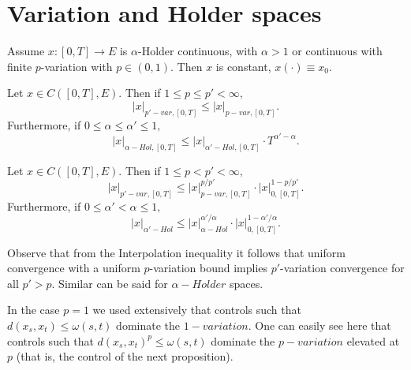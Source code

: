 \section{Variation and Holder spaces}

\begin{proposition}
    Assume $x: [0,T] \rightarrow E$ is $\alpha$-Holder continuous, with $\alpha > 1$ or continuous with finite $p$-variation with $p \in (0, 1).$
    Then $x$ is constant, $x(\cdot) \equiv x_0.$
\end{proposition}

\begin{proposition}
    Let $x \in C([0,T], E)$. Then if $1 \leq p \leq p' < \infty,$
    \begin{equation}
        |x|_{p'-var, [0,T]} \leq |x|_{p-var, [0,T]}. 
    \end{equation} 
    Furthermore, if $0 \leq \alpha \leq \alpha' \leq 1,$
    \begin{equation}
        |x|_{\alpha-Hol,[0,T]} \leq |x|_{\alpha'-Hol,[0,T]} \cdot T^{\alpha' - \alpha}.
    \end{equation}
\end{proposition}

\begin{proposition}[Interpolation]
        Let $x \in C([0,T], E)$. Then if $1 \leq p < p' < \infty,$
    \begin{equation}
        |x|_{p'-var, [0,T]} \leq |x|_{p-var, [0,T]}^{p/p'} \cdot |x|_{0,[0,T]}^{1 - p/p'}. 
    \end{equation} 
    Furthermore, if $0 \leq \alpha' < \alpha \leq 1,$
    \begin{equation}
        |x|_{\alpha'-Hol} \leq |x|_{\alpha-Hol}^{\alpha' / \alpha} \cdot |x|_{0,[0,T]}^{1 - \alpha' / \alpha}.
    \end{equation}
\end{proposition}

Observe that from the Interpolation inequality it follows that uniform convergence with a uniform $p$-variation bound implies $p'$-variation convergence for all $p' > p$.
Similar can be said for $\alpha-Holder$ spaces.

\begin{observation}
    In the case $p=1$ we used extensively that controls such that $d(x_s, x_t) \leq \omega(s,t)$ dominate the $1-variation.$ One can easily see here that controls such that $d(x_s, x_t)^p \leq \omega(s,t)$ dominate the $p-variation$ elevated at $p$ (that is, the control of the next proposition).
\end{observation}

